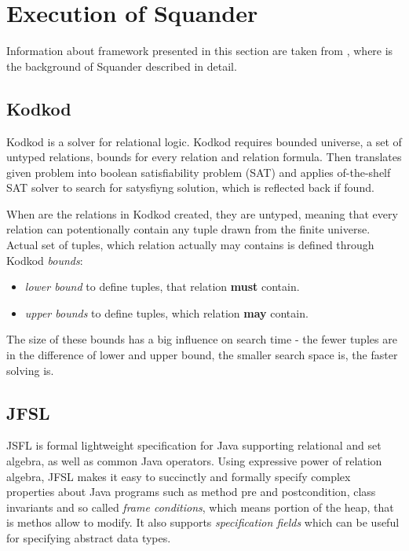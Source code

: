 \documentclass[11pt,twoside,a4paper]{book}
\begin{document}
\section{Execution of Squander}

Information about framework presented in this section are taken from
\cite{milicevic:executableSpecificationsForJavaPrograms}, where is
the background of Squander described in detail.

\subsection{Kodkod}
Kodkod is a solver for relational logic. Kodkod requires bounded universe, a
set of untyped relations, bounds for every relation and relation formula. Then
translates given problem into boolean satisfiability problem (SAT) and applies
of-the-shelf SAT solver to search for satysfiyng solution, which is reflected
back if found.

When are the relations in Kodkod created, they are untyped, meaning that every
relation can potentionally contain any tuple drawn from the finite universe.
Actual set of tuples, which relation actually may contains is defined through
Kodkod \textit{bounds}:
\begin{itemize}
  \item \textit{lower bound} to define tuples, that relation \textbf{must}
  contain.
  \item \textit{upper bounds} to define tuples, which relation \textbf{may}
  contain.
\end{itemize}

The size of these bounds has a big influence on search time - the fewer tuples
are in the difference of lower and upper bound, the smaller search space is, the
faster solving is.


\subsection{JFSL}
JSFL is formal lightweight specification for Java supporting relational and set
algebra, as well as common Java operators. Using expressive power of relation
algebra, JFSL makes it easy to succinctly and formally specify complex
properties about Java programs such as method pre and postcondition, class
invariants and so called \textit{frame conditions}, which means portion of the
heap, that is methos allow to modify. It also supports \textit{specification
fields} which can be useful for specifying abstract data types. 
\end{document}
